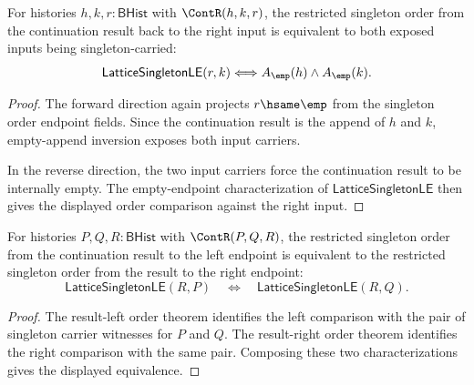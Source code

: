 \begin{theorem}
\label{thm:lattice-singleton-le-continuation-result-right-carriers}
For histories $h,k,r:\mathsf{BHist}$ with $\ContR(h,k,r)$, the restricted
singleton order from the continuation result back to the right input is
equivalent to both exposed inputs being singleton-carried:
$$
\mathsf{LatticeSingletonLE}(r,k)
\Longleftrightarrow
A_{\emp}(h)\land A_{\emp}(k).
$$
\end{theorem}
\begin{proof}
The forward direction again projects $r\hsame\emp$ from the singleton order
endpoint fields. Since the continuation result is the append of $h$ and $k$,
empty-append inversion exposes both input carriers.

In the reverse direction, the two input carriers force the continuation result
to be internally empty. The empty-endpoint characterization of
$\mathsf{LatticeSingletonLE}$ then gives the displayed order comparison
against the right input.
\end{proof}

\begin{theorem}
\label{thm:lattice-singleton-le-continuation-result-left-right}
For histories $P,Q,R:\mathsf{BHist}$ with $\ContR(P,Q,R)$, the restricted
singleton order from the continuation result to the left endpoint is equivalent
to the restricted singleton order from the result to the right endpoint:
$$
\mathsf{LatticeSingletonLE}(R,P)
\quad\Longleftrightarrow\quad
\mathsf{LatticeSingletonLE}(R,Q).
$$
\end{theorem}
\begin{proof}
The result-left order theorem identifies the left comparison with the pair of
singleton carrier witnesses for $P$ and $Q$. The result-right order theorem
identifies the right comparison with the same pair. Composing these two
characterizations gives the displayed equivalence.
\end{proof}

